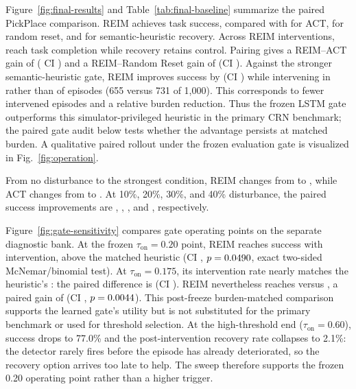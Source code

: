 \documentclass[conference]{IEEEtran}
\begin{document}
Figure~\ref{fig:final-results} and Table~\ref{tab:final-baseline} summarize
the paired PickPlace comparison. REIM achieves \FinalREIMSuccess{} task
success, compared with
\FinalACTSuccess{} for ACT, \FinalResetSuccess{} for random reset, and
\FinalRLRecoverySuccess{} for semantic-heuristic recovery. Across REIM
interventions, \FinalREIMRecovery{} reach task completion while recovery
retains control. Pairing gives a REIM--ACT gain of \FinalREIMGain{}
(\ConfidenceLevel{} CI \FinalREIMGainCI) and a REIM--Random Reset gain of
\FinalREIMGainVsReset{} (CI \FinalREIMGainVsResetCI). Against the stronger
semantic-heuristic gate, REIM improves success by \FinalREIMDeltaVsRL{} (CI
\FinalREIMDeltaVsRLCI) while intervening in \FinalREIMIntervention{} rather
than \FinalRLRecoveryIntervention{} of episodes (655 versus 731 of 1,000).
This corresponds to \FinalREIMFewerIntervenedEpisodes{} fewer intervened
episodes and a
\FinalREIMInterventionReductionVsRL{} relative burden reduction. Thus the
frozen LSTM gate outperforms this simulator-privileged heuristic in the
primary CRN benchmark; the paired gate audit below tests whether the advantage
persists at matched burden. A qualitative paired rollout under the frozen
evaluation gate is visualized in Fig.~\ref{fig:operation}.

From no disturbance to the strongest condition, REIM changes from
\FinalREIMSuccessAtZeroNoise{} to \FinalREIMSuccessAtFortyNoise{}, while ACT
changes from \FinalACTSuccessAtZeroNoise{} to
\FinalACTSuccessAtFortyNoise{}. At 10\%, 20\%, 30\%, and 40\% disturbance,
the paired success improvements are \FinalREIMGainAtTenNoise{},
\FinalREIMGainAtTwentyNoise{}, \FinalREIMGainAtThirtyNoise{}, and
\FinalREIMGainAtFortyNoise{}, respectively.

Figure~\ref{fig:gate-sensitivity} compares gate operating points on the
separate diagnostic bank. At the frozen $\tau_{\mathrm{on}}=0.20$ point,
REIM reaches \GateTauTwentySuccess{} success with
\GateTauTwentyIntervention{} intervention, \GateTauTwentyGainVsHeuristic{}
above the matched heuristic (CI \GateTauTwentyGainVsHeuristicCI,
$p=0.0490$, exact two-sided McNemar/binomial test). At
$\tau_{\mathrm{on}}=0.175$, its intervention rate
\GateTauSeventeenFiveIntervention{} nearly matches the heuristic's
\GateHeuristicIntervention{}: the paired difference is
\GateTauSeventeenFiveInterventionDelta{} (CI
\GateTauSeventeenFiveInterventionDeltaCI). REIM nevertheless reaches
\GateTauSeventeenFiveSuccess{} versus \GateHeuristicSuccess{}, a paired gain of
\GateTauSeventeenFiveGainVsHeuristic{} (CI
\GateTauSeventeenFiveGainVsHeuristicCI, $p=0.0044$). This
post-freeze burden-matched comparison supports the learned gate's utility but
is not substituted for the primary benchmark or used for threshold selection.
At the high-threshold end ($\tau_{\mathrm{on}} = 0.60$), success drops to
77.0\% and the post-intervention recovery rate collapses to 2.1\%: the
detector rarely fires before the episode has already deteriorated, so the
recovery option arrives too late to help. The sweep therefore supports the
frozen 0.20 operating point rather than a higher trigger.
\end{document}
